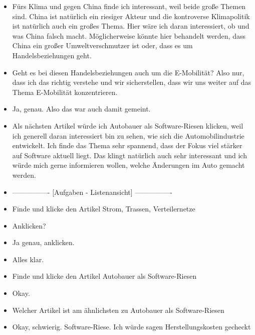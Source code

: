 {\begin{itemize}[]
                  Also ich habe im Vorfeld natürlich bereits ein bestimmtes Bild worum es gehen könnte bei den Titeln und wollte mir deswegen die Artikel anschauen.
            \item {} \flqq Fürs Klima und gegen China\frqq{} finde ich interessant, weil beide große Themen sind.
                  China ist natürlich ein riesiger Akteur und die kontroverse Klimapolitik ist natürlich auch ein großes Thema.
                  Hier wäre ich daran interessiert, ob und was China falsch macht.
                  Möglicherweise könnte hier behandelt werden, dass China ein großer Umweltverschmutzer ist oder, dass es um Handelsbeziehungen geht.
            \item {} Geht es bei diesen Handelsbeziehungen auch um die E-Mobilität?
                  Also nur, dass ich das richtig verstehe und wir sicherstellen, dass wir uns weiter auf das Thema E-Mobilität konzentrieren.
            \item {} Ja, genau. Also das war auch damit gemeint.
            \item {} Als nächsten Artikel würde ich \flqq Autobauer als Software-Riesen\frqq{} klicken, weil ich generell daran interessiert bin zu sehen, wie sich die Automobilindustrie entwickelt.
                  Ich finde das Thema sehr spannend, dass der Fokus viel stärker auf Software aktuell liegt.
                  Das klingt natürlich auch sehr interessant und ich würde mich gerne informieren wollen, welche Änderungen im Auto gemacht werden.
            \item {----------------} [Aufgaben - Listenansicht] {----------------}
            \item {} Finde und klicke den Artikel \flqq Strom, Trassen, Verteilernetze\frqq{}
            \item {} Anklicken?
            \item {} Ja genau, anklicken.
            \item {} Alles klar.
            \item {} Finde und klicke den Artikel \flqq Autobauer als Software-Riesen\frqq{}
            \item {} Okay.
            \item {} Welcher Artikel ist am ähnlichsten zu \flqq Autobauer als Software-Riesen\frqq{}
            \item {} Okay, schwierig. Software-Riese. Ich würde sagen \flqq Herstellungskosten gecheckt\frqq{}

\end{itemize}}
